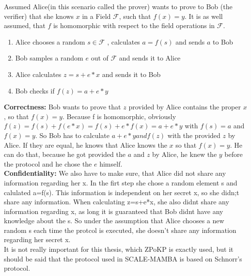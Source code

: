 \documentclass[english,runningheads,a4paper]{llncs}[2018/03/10]
\begin{document}
Assumed Alice(in this scenario called the prover) wants to prove to Bob (the verifier) that she knows \( x\) in a Field \( \mathcal{F} \), such that \(f(x)=y\). It is as well assumed, that \( f \) is homomorphic with respect to the field operations in  \( \mathcal{F} \).
\begin{enumerate}
\item Alice chooses a random \( s \in \mathcal{F} \) , calculates \( a = f(s)\) and sends \( a\) to Bob
\item Bob samples a random  \( e \) out of  \( \mathcal{F} \) and sends it to Alice
\item Alice calculates \( z=s+e*x\) and sends it to Bob
\item Bob checks if \( f(z)=a+e*y\)
\end{enumerate}

\textbf{Correctness:}
Bob wants to prove that \( z\) provided by Alice contains the proper \( x\), so that \( f(x)=y\). 
Because f is homomorphic, obviously \( f(z)=f(s)+f(e*x)=f(s)+e*f(x)=a+e*y\) with \(f(s)=a\) and \(f(x)=y\).
So Bob has to calculate \( a+e*y and f(z)\) with the provided \( z\) by Alice. If they are equal, he knows that Alice knows the \( x\) so that \( f(x)=y\).
He can do that, because he got provided the \( a\) and \( z\) by Alice, he knew the \( y\) before the protocol and he chose the \( e\) himself.\\

\textbf{Confidentiality:}
We also have to make sure, that Alice did not share any information regarding her x.
In the firt step she chose a random element s and calulated a=f(s). This information is independent on her secret x, so she didn;t share any information.
When calculating z=s+e*x, she also didnt share any information regarding x, as long it is guaranteed that Bob didnt have any knowledge about the s.
So under the assumption that Alice chooses a new random s each time the protcol is executed, she doesn't share any information regarding her secret x.\\

It is not really important for this thesis, which ZPoKP is exactly used, but it should be said that the protocol used in SCALE-MAMBA is based on Schnorr's protocol.\\
\end{document}
